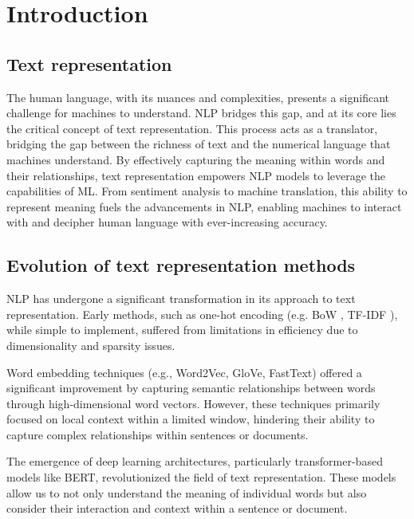 
\chapter{Introduction\label{chap:introduction}}

\section{Text representation}
The human language, with its nuances and complexities, presents a significant challenge for machines to understand.
\ac{NLP} bridges this gap, and at its core lies the critical concept of text representation.
This process acts as a translator, bridging the gap between the richness of text and the numerical language that machines understand.
By effectively capturing the meaning within words and their relationships, text representation empowers \ac{NLP} models to leverage the capabilities of \ac{ML}.
From sentiment analysis to machine translation, this ability to represent meaning fuels the advancements in \ac{NLP}, enabling machines to interact with and decipher human language with ever-increasing accuracy.

\section{Evolution of text representation methods}

\ac{NLP} has undergone a significant transformation in its approach to text representation.
Early methods, such as one-hot encoding (e.g. \ac{BoW} \cite{wiki_BoW}, \ac{TF-IDF} \cite{wiki_tf_idf}), while simple to implement, suffered from limitations in efficiency due to dimensionality and sparsity issues.

Word embedding techniques (e.g., Word2Vec, \ac{GloVe}, FastText) offered a significant improvement by capturing semantic relationships between words through high-dimensional word vectors.
However, these techniques primarily focused on local context within a limited window, hindering their ability to capture complex relationships within sentences or documents.

The emergence of deep learning architectures, particularly transformer-based models like \ac{BERT}, revolutionized the field of text representation.
These models allow us to not only understand the meaning of individual words but also consider their interaction and context within a sentence or document.


